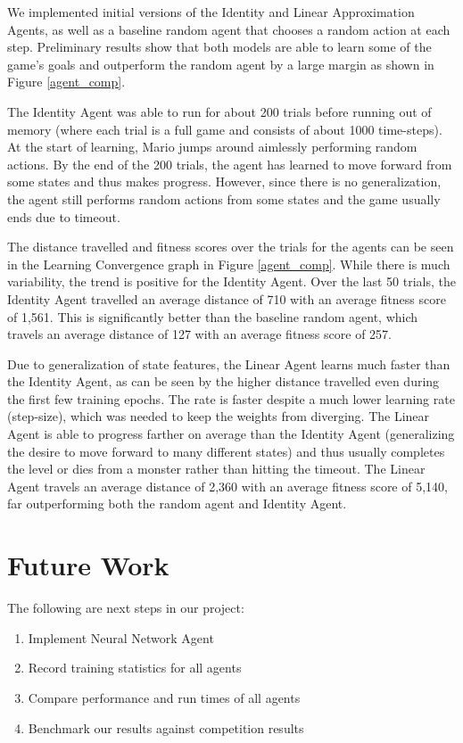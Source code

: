 \documentclass[12pt]{article}
\begin{document}
We implemented initial versions of the Identity and Linear Approximation Agents, as well as a baseline random agent that chooses a random action at each step. Preliminary results show that both models are able to learn some of the game's goals and outperform the random agent by a large margin as shown in Figure \ref{agent_comp}.

The Identity Agent was able to run for about 200 trials before running out of memory (where each trial is a full game and consists of about 1000 time-steps). At the start of learning, Mario jumps around aimlessly performing random actions. By the end of the 200 trials, the agent has learned to move forward from some states and thus makes progress. However, since there is no generalization, the agent still performs random actions from some states and the game usually ends due to timeout. 

The distance travelled and fitness scores over the trials for the agents can be seen in the Learning Convergence graph in Figure \ref{agent_comp}. While there is much variability, the trend is positive for the Identity Agent. Over the last 50 trials, the Identity Agent travelled an average distance of 710 with an average fitness score of 1,561. This is significantly better than the baseline random agent, which travels an average distance of 127 with an average fitness score of 257.

Due to generalization of state features, the Linear Agent learns much faster than the Identity Agent, as can be seen by the higher distance travelled even during the first few training epochs. The rate is faster despite a much lower learning rate (step-size), which was needed to keep the weights from diverging. The Linear Agent is able to progress farther on average than the Identity Agent (generalizing the desire to move forward to many different states) and thus usually completes the level or dies from a monster rather than hitting the timeout. The Linear Agent travels an average distance of 2,360 with an average fitness score of 5,140, far outperforming both the random agent and Identity Agent.

\section{Future Work}

The following are next steps in our project:

\begin{enumerate}
\item Implement Neural Network Agent
\item Record training statistics for all agents
\item Compare performance and run times of all agents
\item Benchmark our results against competition results
\end{enumerate}
\end{document}
